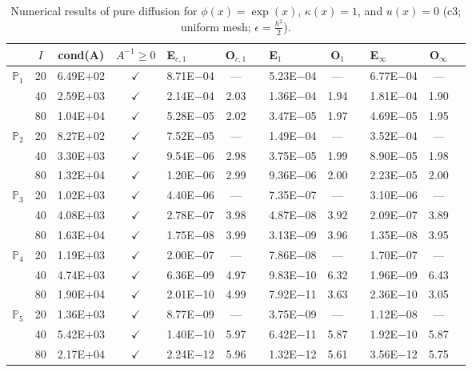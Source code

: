 \begin{table}[H]
\centering
\caption{Numerical results of pure diffusion for $\phi(x)=\exp(x)$, $\kappa(x)=1$, and $u(x)=0$ (c3; uniform mesh; $\epsilon=\frac{h^2}{2}$).}
\begin{tabular}{@{}l c c c l c c l c c l c c@{}}
\toprule
 & $I$ & cond(A) & $A^{-1}\geq 0$ &  E$_{c,1}$ & O$_{c,1}$ && E$_1$ & O$_1$ && E$_{\infty}$ & O$_{\infty}$\\
\midrule
\multirow{3}{*}{$\mathbb{P}_{1}$}
 & 20 & 6.49E$+$02 & $\checkmark$ & 8.71E$-$04 & --- && 5.23E$-$04 & --- && 6.77E$-$04 & ---\\
 & 40 & 2.59E$+$03 & $\checkmark$ & 2.14E$-$04 & 2.03 && 1.36E$-$04 & 1.94 && 1.81E$-$04 & 1.90\\
 & 80 & 1.04E$+$04 & $\checkmark$ & 5.28E$-$05 & 2.02 && 3.47E$-$05 & 1.97 && 4.69E$-$05 & 1.95\\
\midrule
\multirow{3}{*}{$\mathbb{P}_{2}$}
 & 20 & 8.27E$+$02 & $\checkmark$ & 7.52E$-$05 & --- && 1.49E$-$04 & --- && 3.52E$-$04 & ---\\
 & 40 & 3.30E$+$03 & $\checkmark$ & 9.54E$-$06 & 2.98 && 3.75E$-$05 & 1.99 && 8.90E$-$05 & 1.98\\
 & 80 & 1.32E$+$04 & $\checkmark$ & 1.20E$-$06 & 2.99 && 9.36E$-$06 & 2.00 && 2.23E$-$05 & 2.00\\
\midrule
\multirow{3}{*}{$\mathbb{P}_{3}$}
 & 20 & 1.02E$+$03 & $\checkmark$ & 4.40E$-$06 & --- && 7.35E$-$07 & --- && 3.10E$-$06 & ---\\
 & 40 & 4.08E$+$03 & $\checkmark$ & 2.78E$-$07 & 3.98 && 4.87E$-$08 & 3.92 && 2.09E$-$07 & 3.89\\
 & 80 & 1.63E$+$04 & $\checkmark$ & 1.75E$-$08 & 3.99 && 3.13E$-$09 & 3.96 && 1.35E$-$08 & 3.95\\
\midrule
\multirow{3}{*}{$\mathbb{P}_{4}$}
 & 20 & 1.19E$+$03 & $\checkmark$ & 2.00E$-$07 & --- && 7.86E$-$08 & --- && 1.70E$-$07 & ---\\
 & 40 & 4.74E$+$03 & $\checkmark$ & 6.36E$-$09 & 4.97 && 9.83E$-$10 & 6.32 && 1.96E$-$09 & 6.43\\
 & 80 & 1.90E$+$04 & $\checkmark$ & 2.01E$-$10 & 4.99 && 7.92E$-$11 & 3.63 && 2.36E$-$10 & 3.05\\
\midrule
\multirow{3}{*}{$\mathbb{P}_{5}$}
 & 20 & 1.36E$+$03 & $\checkmark$ & 8.77E$-$09 & --- && 3.75E$-$09 & --- && 1.12E$-$08 & ---\\
 & 40 & 5.42E$+$03 & $\checkmark$ & 1.40E$-$10 & 5.97 && 6.42E$-$11 & 5.87 && 1.92E$-$10 & 5.87\\
 & 80 & 2.17E$+$04 & $\checkmark$ & 2.24E$-$12 & 5.96 && 1.32E$-$12 & 5.61 && 3.56E$-$12 & 5.75\\
\bottomrule
\end{tabular}
\end{table}